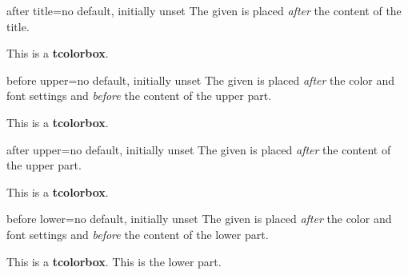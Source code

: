 \begin{docTcbKey}{after title}{=}{no default, initially unset}
  The given  is placed \emph{after} the content of the title.
\begin{dispExample}

\begin{tcolorbox}[title=My title]
This is a \textbf{tcolorbox}.
\end{tcolorbox}
\end{dispExample}
\end{docTcbKey}


\begin{docTcbKey}{before upper}{=}{no default, initially unset}
  The given  is placed \emph{after} the color and font settings
  and \emph{before} the content of the upper part.
\begin{dispExample}

\begin{tcolorbox}[title=My title]
This is a \textbf{tcolorbox}.
\end{tcolorbox}
\end{dispExample}
\end{docTcbKey}

\clearpage
\begin{docTcbKey}{after upper}{=}{no default, initially unset}
  The given  is placed \emph{after} the content of the upper part.
\begin{dispExample}

\begin{tcolorbox}[title=My title]
This is a \textbf{tcolorbox}.
\end{tcolorbox}
\end{dispExample}
\end{docTcbKey}


\begin{docTcbKey}{before lower}{=}{no default, initially unset}
  The given  is placed \emph{after} the color and font settings
  and \emph{before} the content of the lower part.
\begin{dispExample}

\begin{tcolorbox}
This is a \textbf{tcolorbox}.
\tcblower
This is the lower part.
\end{tcolorbox}
\end{dispExample}
\end{docTcbKey}


